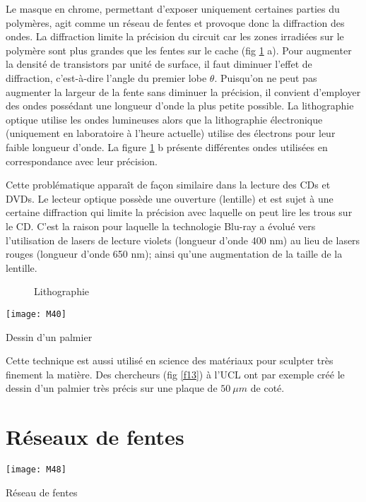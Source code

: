 \noindent Le masque en chrome, permettant d'exposer uniquement certaines parties du polymères, agit comme un réseau de fentes et provoque donc la diffraction des ondes. La diffraction limite la précision du circuit car les zones irradiées sur le polymère sont plus grandes que les fentes sur le cache (fig \ref{d9} a). Pour augmenter la densité de transistors par unité de surface,
il faut diminuer l'effet de diffraction, c'est-à-dire l'angle du premier lobe $\theta$. Puisqu'on ne peut pas augmenter la largeur de la fente sans diminuer la précision, il convient d'employer des ondes possédant une longueur d'onde la plus petite possible. La lithographie optique utilise les ondes lumineuses alors que la lithographie électronique (uniquement en laboratoire à l'heure actuelle) utilise des électrons pour leur faible longueur d'onde. La figure \ref{d9} b présente différentes ondes utilisées en correspondance avec leur précision.

\noindent Cette problématique apparaît de façon similaire dans la lecture des CDs et DVDs. Le lecteur optique possède une ouverture (lentille) et est sujet à une certaine diffraction qui limite la précision avec laquelle on peut lire les trous sur le CD. C'est la raison pour laquelle la technologie Blu-ray a évolué vers l'utilisation de lasers de lecture violets (longueur d'onde 400 nm) au lieu de lasers rouges (longueur d'onde 650 nm); ainsi qu'une augmentation de la taille de la lentille.

\begin{figure}[h]
\centering
\subfloat[]{\texttt{[image: M38]}}
        \quad
\subfloat[]{\texttt{[image: M39]}}
\caption{Lithographie}
        \label{d9}
\end{figure}

\begin{marginfigure}[0cm]
\texttt{[image: M40]}
\caption{Dessin d'un palmier}
\label{f13}
\end{marginfigure}

\noindent Cette technique est aussi utilisé en science des matériaux pour sculpter très finement la matière. Des chercheurs (fig \ref{f13}) à l'UCL ont par exemple créé le dessin d'un palmier très précis sur une plaque de $50\:\mu m$ de coté.

\section{Réseaux de fentes}

\begin{marginfigure}[0cm]
\texttt{[image: M48]}
\caption{Réseau de fentes}
\label{f12}
\end{marginfigure}

